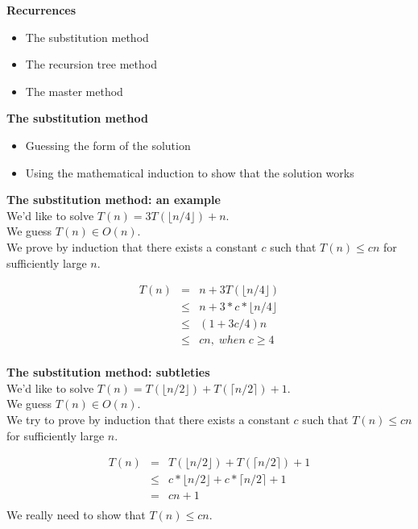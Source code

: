 \documentclass{seminar}
\begin{document}
\begin{slide}
{\bf Recurrences}
\begin{itemize}
\item The substitution method
\item The recursion tree method
\item The master method
\end{itemize}
\end{slide}
\begin{slide}
{\bf The substitution method}
\begin{itemize}
\item Guessing the form of the solution
\item Using the mathematical induction to show that the solution works
\end{itemize}
\end{slide}

\begin{slide}
{\bf The substitution method: an example} \\
We'd like to solve $T(n)=3T(\lfloor n/4 \rfloor)+n$. \\
We guess $T(n) \in O(n)$. \\
We prove by induction that there exists a constant $c$ such that $T(n)
\le cn $ for sufficiently large $n$.

\begin{eqnarray*}
T(n) & = & n + 3T(\lfloor n/4 \rfloor) \\ 
     & \le & n + 3*c*\lfloor n/4 \rfloor \\
     & \le & (1+3c/4)n  \\
     & \le & cn, \; when \; c \ge 4 \\
\end{eqnarray*}
\end{slide}


\begin{slide}
{\bf The substitution method: subtleties} \\
We'd like to solve $T(n)=T(\lfloor n/2 \rfloor)+ T(\lceil n/2 \rceil) + 1$. \\
We guess $T(n) \in O(n)$. \\
We try to prove by induction that there exists a constant $c$ such that $T(n)
\le cn $ for sufficiently large $n$.

\begin{eqnarray*}
T(n) & = & T(\lfloor n/2 \rfloor)+ T(\lceil n/2 \rceil) + 1 \\ 
     & \le & c*\lfloor n/2 \rfloor + c*\lceil n/2 \rceil + 1\\
     & = & cn + 1  \\
\end{eqnarray*}
We really need to show that $T(n) \le cn$.
\end{slide}
\end{document}

